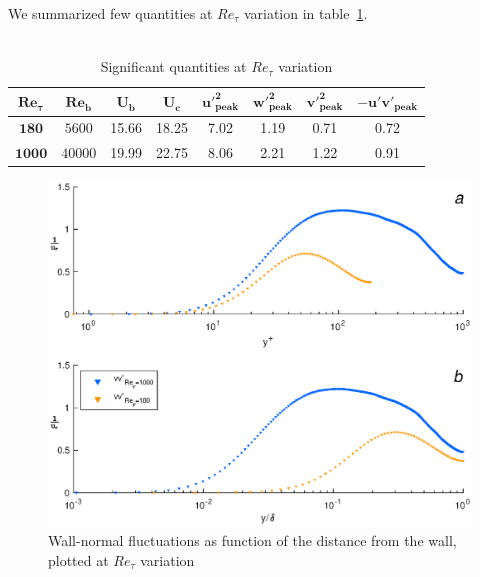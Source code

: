 We summarized few quantities at $Re_{\tau}$ variation in table~\ref{quantities:Re}.\\~\par

\begin{table}[h]
\caption{Significant quantities at $Re_{\tau}$ variation}
\begin{center}
\begin{tabular}{cccccccc}
\toprule
$\mathbf{Re_{\tau}}$ & $\mathbf{Re_{b}}$ & $\mathbf{U_{b}}$ & $\mathbf{U_{c}}$ & $\mathbf{u'^{2}_{peak}}$ & $\mathbf{w'^{2}_{peak}}$ & $\mathbf{v'^{2}_{peak}}$ & $\mathbf{-u'v'_{peak}}$\\
\hline
$\mathbf{180}$ & $5600$ & 15.66 & 18.25 & 7.02 & 1.19 & 0.71 & 0.72 \\
$\mathbf{1000}$ & $40000$ & 19.99 & 22.75 & 8.06 & 2.21 & 1.22 & 0.91 \\
\bottomrule
\end{tabular}
\end{center}
\label{quantities:Re}
\end{table}

\begin{figure}
\begin{center}
\includegraphics[scale=0.55]{grafici/vv_comparison}
\caption{Wall-normal fluctuations as function of the distance from the wall, plotted at $Re_{\tau}$ variation}
\label{vv:comparison}
\end{center}
\end{figure}

